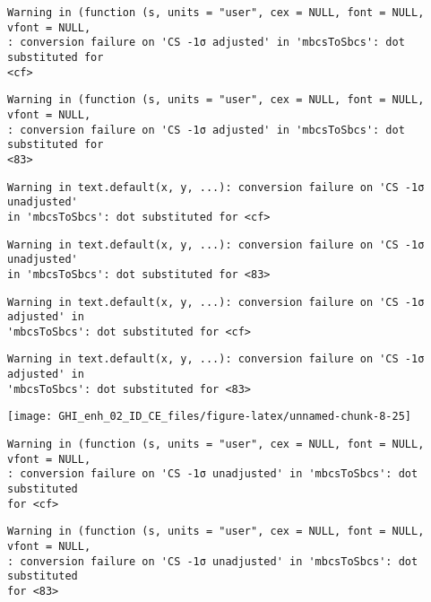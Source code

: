 \documentclass[
  10pt,
  a4paper,oneside]{article}
\begin{document}
\begin{verbatim}
Warning in (function (s, units = "user", cex = NULL, font = NULL, vfont = NULL,
: conversion failure on 'CS -1σ adjusted' in 'mbcsToSbcs': dot substituted for
<cf>
\end{verbatim}

\begin{verbatim}
Warning in (function (s, units = "user", cex = NULL, font = NULL, vfont = NULL,
: conversion failure on 'CS -1σ adjusted' in 'mbcsToSbcs': dot substituted for
<83>
\end{verbatim}

\begin{verbatim}
Warning in text.default(x, y, ...): conversion failure on 'CS -1σ unadjusted'
in 'mbcsToSbcs': dot substituted for <cf>
\end{verbatim}

\begin{verbatim}
Warning in text.default(x, y, ...): conversion failure on 'CS -1σ unadjusted'
in 'mbcsToSbcs': dot substituted for <83>
\end{verbatim}

\begin{verbatim}
Warning in text.default(x, y, ...): conversion failure on 'CS -1σ adjusted' in
'mbcsToSbcs': dot substituted for <cf>
\end{verbatim}

\begin{verbatim}
Warning in text.default(x, y, ...): conversion failure on 'CS -1σ adjusted' in
'mbcsToSbcs': dot substituted for <83>
\end{verbatim}

\begin{center}\texttt{[image: GHI\_enh\_02\_ID\_CE\_files/figure-latex/unnamed-chunk-8-25]} \end{center}

\begin{verbatim}
Warning in (function (s, units = "user", cex = NULL, font = NULL, vfont = NULL,
: conversion failure on 'CS -1σ unadjusted' in 'mbcsToSbcs': dot substituted
for <cf>
\end{verbatim}

\begin{verbatim}
Warning in (function (s, units = "user", cex = NULL, font = NULL, vfont = NULL,
: conversion failure on 'CS -1σ unadjusted' in 'mbcsToSbcs': dot substituted
for <83>
\end{verbatim}
\end{document}
